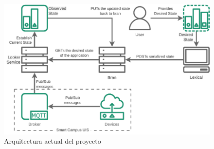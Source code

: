 
 

\begin{figure}[ht]
    \centering
    \caption{Arquitectura actual del proyecto}
    \label{fig:StarDuckBasic}
    \includegraphics[width=\linewidth]{images/StarDuckBasic.pdf}
\end{figure}

